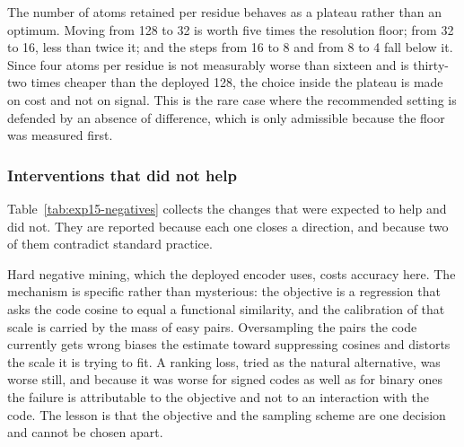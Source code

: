 \begin{table}[htbp]
  \centering
  \caption{Encoding mechanisms against a pooled control fitted on the same proteins
  with the same objective and budget. Held out on 2{,}646 proteins.
  $^{\dagger}$~below the resolution floor of Section~\ref{sec:exp15-floor}.}
  \label{tab:exp15-mechanism}
  
\end{table}

The number of atoms retained per residue behaves as a plateau rather than an optimum.
Moving from 128 to 32 is worth five times the resolution floor; from 32 to 16, less
than twice it; and the steps from 16 to 8 and from 8 to 4 fall below it. Since four
atoms per residue is not measurably worse than sixteen and is thirty-two times
cheaper than the deployed 128, the choice inside the plateau is made on cost and not
on signal. This is the rare case where the recommended setting is defended by an
absence of difference, which is only admissible because the floor was measured first.

\subsubsection{Interventions that did not help}

Table~\ref{tab:exp15-negatives} collects the changes that were expected to help and
did not. They are reported because each one closes a direction, and because two of
them contradict standard practice.

\begin{table}[htbp]
  \centering
  \caption{Interventions measured against the identical arm without them.
  $^{\dagger}$~below the resolution floor.}
  \label{tab:exp15-negatives}
  
\end{table}

Hard negative mining, which the deployed encoder uses, costs accuracy here. The
mechanism is specific rather than mysterious: the objective is a regression that asks
the code cosine to equal a functional similarity, and the calibration of that scale
is carried by the mass of easy pairs. Oversampling the pairs the code currently gets
wrong biases the estimate toward suppressing cosines and distorts the scale it is
trying to fit. A ranking loss, tried as the natural alternative, was worse still, and
because it was worse for signed codes as well as for binary ones the failure is
attributable to the objective and not to an interaction with the code. The lesson is
that the objective and the sampling scheme are one decision and cannot be chosen
apart.

